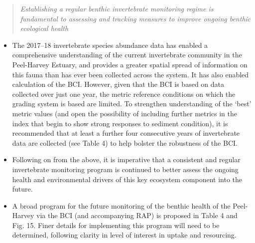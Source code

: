 \documentclass[
]{book}
\begin{document}
\begin{quote}
\emph{Establishing a regular benthic invertebrate monitoring regime is fundamental to assessing and tracking measures to improve ongoing benthic ecological health}
\end{quote}

\begin{itemize}
\item
  The 2017--18 invertebrate species abundance data has enabled a comprehensive understanding of the current invertebrate community in the Peel-Harvey Estuary, and provides a greater spatial spread of information on this fauna than has ever been collected across the system. It has also enabled calculation of the BCI. However, given that the BCI is based on data collected over just one year, the metric reference conditions on which the grading system is based are limited. To strengthen understanding of the `best' metric values (and open the possibility of including further metrics in the index that begin to show strong responses to sediment condition), it is recommended that at least a further four consecutive years of invertebrate data are collected (see Table 4) to help bolster the robustness of the BCI.~
\item
  Following on from the above, it is imperative that a consistent and regular invertebrate monitoring program is continued to better assess the ongoing health and environmental drivers of this key ecosystem component into the future.
\item
  A broad program for the future monitoring of the benthic health of the Peel-Harvey via the BCI (and accompanying RAP) is proposed in Table 4 and Fig. 15. Finer details for implementing this program will need to be determined, following clarity in level of interest in uptake and resourcing.~
\end{itemize}
\end{document}
